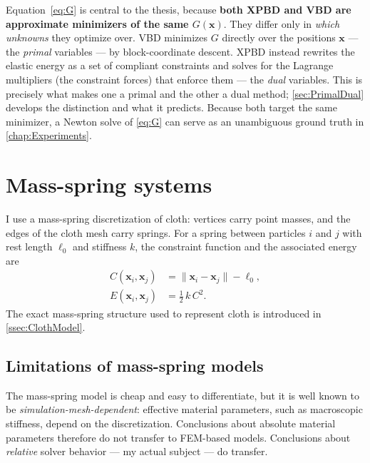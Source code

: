 Equation~\eqref{eq:G} is central to the thesis, because \textbf{both XPBD and VBD
are approximate minimizers of the same $G(\mathbf{x})$}. They differ only in
\emph{which unknowns} they optimize over. VBD minimizes $G$ directly over the
positions $\mathbf{x}$ --- the \emph{primal} variables --- by block-coordinate
descent. XPBD instead rewrites the elastic energy as a set of compliant
constraints and solves for the Lagrange multipliers (the constraint forces) that
enforce them --- the \emph{dual} variables. This is precisely what makes one a
primal and the other a dual method; \autoref{sec:PrimalDual} develops the
distinction and what it predicts. Because both target the same minimizer, a
Newton solve of \eqref{eq:G} can serve as an unambiguous ground truth in
\autoref{chap:Experiments}.

\section{Mass-spring systems}
\label{sec:MassSpring}
I use a mass-spring discretization of cloth: vertices carry point masses, and the
edges of the cloth mesh carry springs. For a spring between particles $i$ and $j$
with rest length $\ell_0$ and stiffness $k$, the constraint function and the
associated energy are
\begin{align}
    C(\mathbf{x}_i, \mathbf{x}_j) &= \|\mathbf{x}_i - \mathbf{x}_j\| - \ell_0, \\
    E(\mathbf{x}_i, \mathbf{x}_j) &= \tfrac{1}{2}\, k\, C^{2}.
\end{align}
The exact mass-spring structure used to represent cloth is introduced in
\autoref{ssec:ClothModel}.

\subsection{Limitations of mass-spring models}
\label{ssec:MSSLimits}
The mass-spring model is cheap and easy to differentiate, but it is well known to
be \emph{simulation-mesh-dependent}: effective material parameters, such as
macroscopic stiffness, depend on the discretization. Conclusions about absolute
material parameters therefore do not transfer to FEM-based models. Conclusions
about \emph{relative} solver behavior --- my actual subject --- do transfer.

